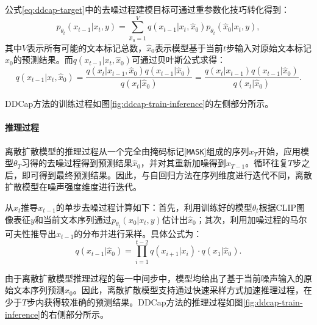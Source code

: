 公式\eqref{eq:ddcap-target}中的去噪过程建模目标可通过重参数化技巧\cite{VQ-diffusion}转化得到：
\begin{equation}
    p_{\theta_t}(x_{t-1} | x_{t}, y)=\sum_{\hat{x}_0=1}^{V}q(x_{t-1}|x_{t},\hat{x}_0)p_{\theta_t}(\hat{x}_0 | x_{t}, y),
\end{equation}
其中$V$表示所有可能的文本标记总数，$\hat{x}_0$表示模型基于当前$t$步输入对原始文本标记$x_{0}$的预测结果。而$q(x_{t-1}|x_{t},\hat{x}_0)$可通过贝叶斯公式求得：
\begin{equation}
    q(x_{t-1}|x_{t},\hat{x}_0)=\frac{q(x_{t}|x_{t-1},\hat{x}_0)q(x_{t-1}|\hat{x}_0)}{q(x_{t}|\hat{x}_0)}=\frac{q(x_{t}|x_{t-1})q(x_{t-1}|\hat{x}_0)}{q(x_{t}|\hat{x}_0)}.
\end{equation}

DDCap方法的训练过程如图\ref{fig:ddcap-train-inference}的左侧部分所示。

\paragraph{推理过程} 离散扩散模型的推理过程从一个完全由掩码标记[\texttt{MASK}]组成的序列$x_{T}$开始，应用模型$\theta_{T}$习得的去噪过程得到预测结果$\hat{x}_{0}$，并对其重新加噪得到$x_{T-1}$。循环往复$T$步之后，即可得到最终预测结果。因此，与自回归方法在序列维度进行迭代不同，离散扩散模型在噪声强度维度进行迭代。

从$x_{t}$推导$x_{t-1}$的单步去噪过程计算如下：首先，利用训练好的模型$\theta_t$根据CLIP图像表征$y$和当前文本序列通过$p_{\theta_t}(x_{0} | x_{t}, y)$估计出$\hat{x}_{0}$；其次，利用加噪过程的马尔可夫性推导出$x_{t-1}$的分布并进行采样。具体公式为：
\begin{equation}
    q(x_{t-1} | \hat{x}_{0})=\prod \limits_{i=1}^{t-2} q(x_{i+1} | x_i)\cdot q(x_1 | \hat{x}_{0}).
\end{equation}

由于离散扩散模型推理过程的每一中间步中，模型均给出了基于当前噪声输入的原始文本序列预测$\hat{x}_{0}$。因此，离散扩散模型支持通过快速采样方式加速推理过程，在少于$T$步内获得较准确的预测结果。DDCap方法的推理过程如图\ref{fig:ddcap-train-inference}的右侧部分所示。


